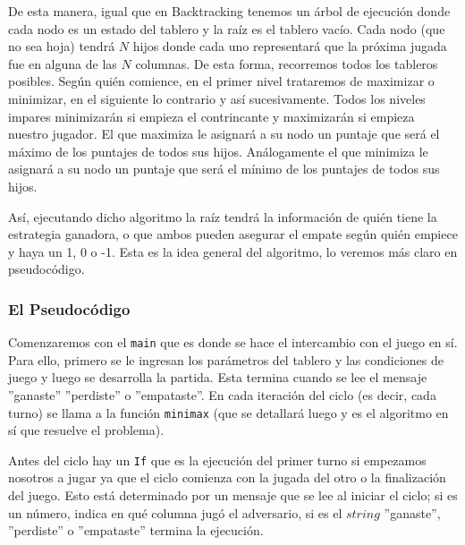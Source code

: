 \documentclass[A4paper,oneside,fleqn,11pt]{article}
\theoremstyle{definition}
\begin{document}
De esta manera, igual que en Backtracking tenemos un árbol de ejecución donde cada nodo es un estado del tablero y la raíz es el tablero vacío. Cada nodo (que no sea hoja) tendrá $N$ hijos donde cada uno representará que la próxima jugada fue en alguna de las $N$ columnas. De esta forma, recorremos todos los tableros posibles. Según quién comience, en el primer nivel trataremos de maximizar o minimizar, en el siguiente lo contrario y así sucesivamente. Todos los niveles impares minimizarán si empieza el contrincante y maximizarán si empieza nuestro jugador. El que maximiza le asignará a su nodo un puntaje que será el máximo de los puntajes de todos sus hijos. Análogamente el que minimiza le asignará a su nodo un puntaje que será el mínimo de los puntajes de todos sus hijos.

Así, ejecutando dicho algoritmo la raíz tendrá la información de quién tiene la estrategia ganadora, o que ambos pueden asegurar el empate según quién empiece y haya un 1, 0 o -1. Esta es la idea general del algoritmo, lo veremos más claro en pseudocódigo.

\subsubsection{El Pseudocódigo}
Comenzaremos con el \texttt{main} que es donde se hace el intercambio con el juego en sí. Para ello, primero se le ingresan los parámetros del tablero y las condiciones de juego y luego se desarrolla la partida. Esta termina cuando se lee el mensaje ''ganaste'' ''perdiste'' o ''empataste''. En cada iteración del ciclo (es decir, cada turno) se llama a la función \texttt{minimax} (que se detallará luego y es el algoritmo en sí que resuelve el problema).

Antes del ciclo hay un \texttt{If} que es la ejecución del primer turno si empezamos nosotros a jugar ya que el ciclo comienza con la jugada del otro o la finalización del juego. Esto está determinado por un mensaje que se lee al iniciar el ciclo; si es un número, indica en qué columna jugó el adversario, si es el $string$ ''ganaste'', ''perdiste'' o ''empataste'' termina la ejecución.
\end{document}
